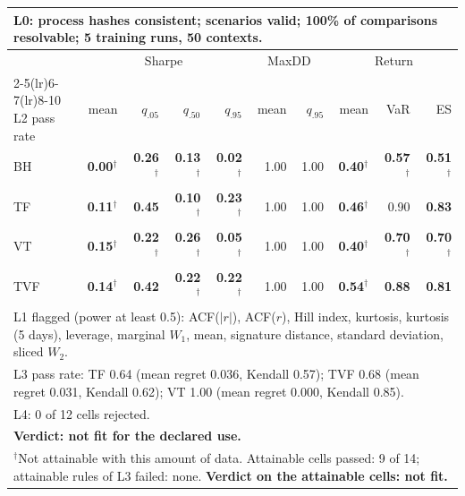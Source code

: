 \begin{tabular}{lrrrrrrrrr}
\toprule
\multicolumn{10}{p{13.5cm}}{L0: process hashes consistent; scenarios valid; 100\% of comparisons resolvable; 5 training runs, 50 contexts.} \\
\midrule
 & \multicolumn{4}{c}{Sharpe} & \multicolumn{2}{c}{MaxDD} & \multicolumn{3}{c}{Return} \\
\cmidrule(lr){2-5}\cmidrule(lr){6-7}\cmidrule(lr){8-10}
L2 pass rate & mean & $q_{.05}$ & $q_{.50}$ & $q_{.95}$ & mean & $q_{.95}$ & mean & VaR & ES \\
\midrule
BH & \textbf{0.00}$^{\dagger}$ & \textbf{0.26}$^{\dagger}$ & \textbf{0.13}$^{\dagger}$ & \textbf{0.02}$^{\dagger}$ & 1.00 & 1.00 & \textbf{0.40}$^{\dagger}$ & \textbf{0.57}$^{\dagger}$ & \textbf{0.51}$^{\dagger}$ \\
TF & \textbf{0.11}$^{\dagger}$ & \textbf{0.45} & \textbf{0.10}$^{\dagger}$ & \textbf{0.23}$^{\dagger}$ & 1.00 & 1.00 & \textbf{0.46}$^{\dagger}$ & 0.90 & \textbf{0.83} \\
VT & \textbf{0.15}$^{\dagger}$ & \textbf{0.22}$^{\dagger}$ & \textbf{0.26}$^{\dagger}$ & \textbf{0.05}$^{\dagger}$ & 1.00 & 1.00 & \textbf{0.40}$^{\dagger}$ & \textbf{0.70}$^{\dagger}$ & \textbf{0.70}$^{\dagger}$ \\
TVF & \textbf{0.14}$^{\dagger}$ & \textbf{0.42} & \textbf{0.22}$^{\dagger}$ & \textbf{0.22}$^{\dagger}$ & 1.00 & 1.00 & \textbf{0.54}$^{\dagger}$ & \textbf{0.88} & \textbf{0.81} \\
\midrule
\multicolumn{10}{p{13.5cm}}{L1 flagged (power at least 0.5): ACF($|r|$), ACF($r$), Hill index, kurtosis, kurtosis (5 days), leverage, marginal $W_1$, mean, signature distance, standard deviation, sliced $W_2$.} \\
\multicolumn{10}{p{13.5cm}}{L3 pass rate: TF 0.64 (mean regret 0.036, Kendall 0.57); TVF 0.68 (mean regret 0.031, Kendall 0.62); VT 1.00 (mean regret 0.000, Kendall 0.85).} \\
\multicolumn{10}{p{13.5cm}}{L4: 0 of 12 cells rejected.} \\
\multicolumn{10}{p{13.5cm}}{\textbf{Verdict: not fit for the declared use.}} \\
\multicolumn{10}{p{13.5cm}}{$^{\dagger}$Not attainable with this amount of data. Attainable cells passed: 9 of 14; attainable rules of L3 failed: none. \textbf{Verdict on the attainable cells: not fit.}} \\
\bottomrule
\end{tabular}
